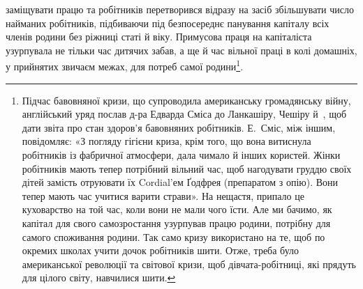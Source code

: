 \parcont{}  %
заміщувати працю та робітників перетворився відразу на засіб
збільшувати число найманих робітників, підбиваючи під безпосереднє
панування капіталу всіх членів родини без ріжниці статі
й віку. Примусова праця на капіталіста узурпувала не тільки час
дитячих забав, а ще й час вільної праці в колі домашніх, у прийнятих
звичаєм межах, для потреб самої родини\footnote{
Підчас бавовняної кризи, що супроводила американську громадянську
війну, англійський уряд послав д-ра Едварда Сміса до Ланкашіру,
Чешіру й~, щоб дати звіта про стан здоров’я бавовняних робітників.
Е.~Сміс, між іншим, повідомляє: «З погляду гігієни криза, крім
того, що вона витиснула робітників із фабричної атмосфери, дала чимало
й інших користей. Жінки робітників мають тепер потрібний вільний
час, щоб нагодувати груддю своїх дітей замість отруювати їх Cordial’ем
Ґодфрея (препаратом з опію). Вони тепер мають час учитися варити страви».
На нещастя, припало це куховарство на той час, коли вони не мали
чого їсти. Але ми бачимо, як капітал для свого самозростання узурпував
працю родини, потрібну для самого споживання родини. Так само кризу
використано на те, щоб по окремих школах учити дочок робітників шити.
Отже, треба було американської революції та світової кризи, щоб дівчата-робітниці,
які прядуть для цілого світу, навчилися шити.
}.

